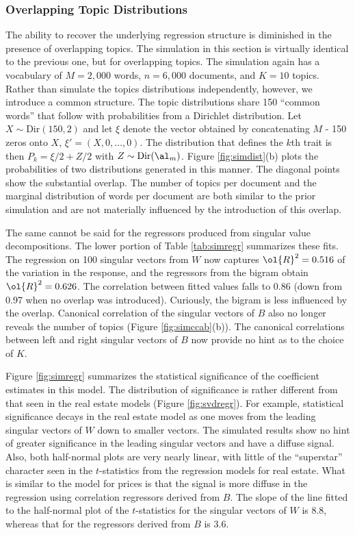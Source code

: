 \documentclass[12pt]{article}
\begin{document}
 
 \subsubsection{Overlapping Topic Distributions} %
 
 The ability to recover the underlying regression structure is diminished in the presence of overlapping topics.  The simulation in this section is virtually identical to the previous one, but for overlapping topics.  The simulation again has a vocabulary of $M=2,000$ words, $n=6,000$ documents, and $K=10$ topics.  Rather than simulate the topics distributions independently, however, we introduce a common structure.  The topic distributions share 150 ``common words'' that follow with probabilities from a Dirichlet distribution.  Let $X \sim \mbox{Dir}(150, 2)$ and let $\xi$ denote the vector obtained by concatenating $M$ - 150 zeros onto $X$, $\xi' = (X, 0 , \ldots, 0)$.  The distribution that defines the $k$th trait is then $P_k = \xi/2 + Z/2$ with $Z \sim \mbox{Dir}(\al_m)$.  Figure \ref{fig:simdist}(b) plots the probabilities of two distributions generated in this manner.  The diagonal points show the substantial overlap.  The number of topics per document and the marginal distribution of words per document are both similar to the prior simulation and are not materially influenced by the introduction of this overlap.
 
 
 The same cannot be said for the regressors produced from singular value decompositions.  The lower portion of Table \ref{tab:simregr} summarizes these fits.  The regression on 100 singular vectors from $W$ now captures $\ol{R}^2 = 0.516$ of the variation in the response, and the regressors from the bigram obtain $\ol{R}^2 = 0.626$.  The correlation between fitted values falls to 0.86 (down from 0.97 when no overlap was introduced).  Curiously, the bigram is less influenced by the overlap.  
 Canonical correlation of the singular vectors of $B$ also no longer reveals the number of topics (Figure \ref{fig:simccab}(b)).   The canonical correlations between left and right singular vectors of $B$ now provide no hint as to the choice of $K$.  
 
 
 Figure \ref{fig:simregr} summarizes the statistical significance of the coefficient estimates in this model.  The distribution of significance is rather different from that seen in the real estate models (Figure \ref{fig:svdregr}).  For example, statistical significance decays in the real estate model as one moves from the leading singular vectors of $W$ down to smaller vectors.  The simulated results show no hint of greater significance in the leading singular vectors and have a diffuse signal.
  Also, both half-normal plots are very nearly linear, with little of the ``superstar'' character seen in the $t$-statistics from the regression models for real estate.  What is similar to the model for prices is that the signal is more diffuse in the regression using correlation regressors derived from $B$.  The slope of the line fitted to the half-normal plot of the $t$-statistics for the singular vectors of $W$ is 8.8, whereas that for the regressors derived from $B$ is 3.6.  
 
\end{document}
